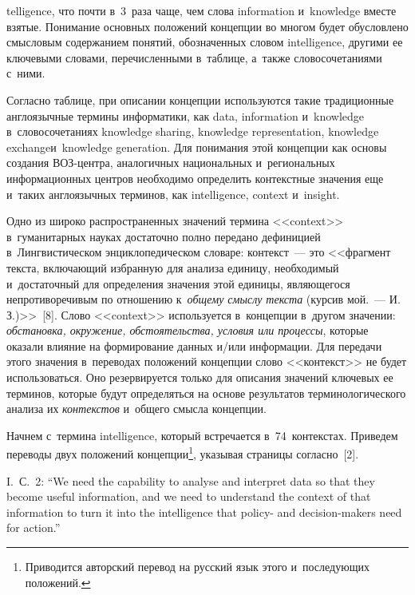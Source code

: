 \begin{multicols}{2}
\vspace*{9pt}

\noindent
telligence, что почти в~3~раза чаще, чем 
слова information и~knowledge вместе взятые. Понимание основных положений 
концепции во многом будет обусловлено смысловым содержанием понятий, 
обозначенных словом intelligence, другими ее ключевыми словами, перечисленными 
в~таблице, а~также словосочетаниями с~ними.

Согласно таблице, при описании концепции используются такие традиционные 
англоязычные термины информатики, как data, information и~knowledge 
в~словосочетаниях knowledge sharing, knowledge representation, knowledge 
exchange\linebreak и~knowledge generation. Для понимания этой концепции как основы 
создания ВОЗ-цент\-ра, ана\-ло\-гич\-ных на\-цио\-наль\-ных и~ре\-гио\-наль\-ных 
информационных цент\-ров необходимо определить \mbox{кон\-текст\-ные} значения еще 
и~таких анг\-ло\-языч\-ных \mbox{терминов}, как intelligence, context и~insight.

Одно из широко распространенных значений термина <<context>> 
в~гуманитарных науках достаточно полно передано дефиницией 
в~Лингвистическом энциклопедическом словаре: контекст~--- это <<фрагмент 
текста, включающий избранную для анализа единицу, необходимый 
и~достаточный для определения значения этой единицы, являющегося 
непротиворечивым по отношению к~\textit{общему смыслу текста} (курсив  
мой.~--- И.\,З.)>>~[8]. Слово <<context>> используется в~концепции в~другом 
значении: \textit{обстановка, окружение, обстоятельства, условия или процессы}, 
которые оказали влияние на формирование данных и/или информации. Для 
передачи этого значения в~переводах положений концепции слово <<контекст>> 
не будет использоваться. Оно резервируется только для описания значений 
ключевых ее терминов, которые будут определяться на основе результатов 
терминологического анализа их \textit{контекстов} и~общего смысла концепции.

Начнем с~термина intelligence, который встречается в~74~контекстах. Приведем 
переводы двух положений концепции\footnote{Приводится авторский перевод на русский 
язык этого и~последующих положений.}, указывая страницы согласно~[2].


I.~С.~2: ``We need the capability to analyse and interpret data so that they become 
useful information, and we need to understand the context of that information to turn it 
into the intelligence that policy- and decision-makers need for action.''


\end{multicols}
